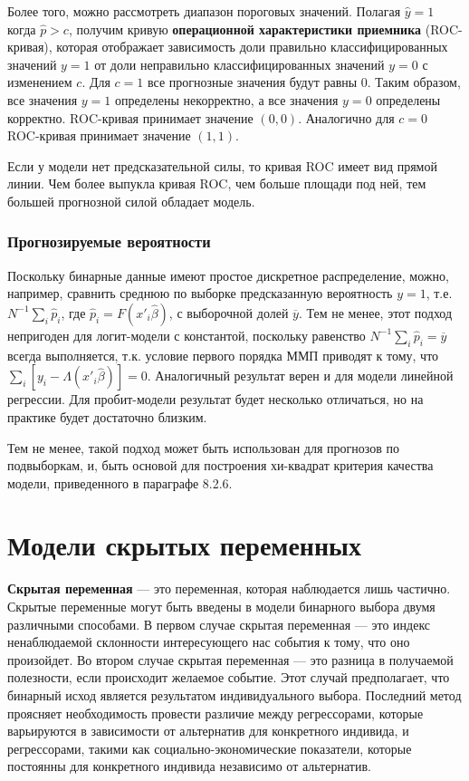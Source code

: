 Более того,  можно рассмотреть диапазон пороговых значений. Полагая $\hat{y}=1$  когда $\hat{p}>c$,  получим кривую \textbf{операционной характеристики приемника} (ROC-кривая),  которая отображает зависимость доли правильно классифицированных значений $y=1$ от доли неправильно классифицированных значений $y=0$ с изменением $c$. Для $c=1$ все прогнозные значения будут равны 0. Таким образом,  все значения  $y=1$ определены некорректно,  а все значения $y=0$ определены корректно. ROC-кривая принимает значение $(0, 0)$. Аналогично для $c=0$ ROC-кривая принимает значение $(1, 1).$

Если у модели нет предсказательной силы, то кривая ROC имеет вид прямой линии. Чем более выпукла кривая ROC, чем больше площади под ней, тем большей прогнозной силой обладает модель.

\subsubsection*{Прогнозируемые вероятности}

Поскольку бинарные данные имеют простое дискретное распределение,  можно, например, сравнить среднюю по выборке предсказанную вероятность  $y=1$, т.е. $N^{-1}\sum_i \hat{p}_i$,  где $\hat{p}_i = F(x'_i \widehat\beta)$,  с выборочной долей $\overline{y}$. Тем не менее,  этот подход непригоден для логит-модели с константой,  поскольку равенство $N^{-1}\sum_i \hat{p}_i=\overline{y}$ всегда выполняется, т.к.  условие первого порядка  ММП приводят к тому, что $\sum_i [y_i-\Lambda (x'_i\widehat\beta)]=0.$ Аналогичный результат верен и для модели линейной регрессии. Для пробит-модели результат будет несколько отличаться,  но на практике будет достаточно близким.

Тем не менее,  такой подход может быть использован для прогнозов по подвыборкам,  и,  быть  основой для построения хи-квадрат критерия качества модели,  приведенного в параграфе 8.2.6.

\section{Модели скрытых переменных}

\textbf{Скрытая переменная} --- это переменная,  которая наблюдается лишь частично. Скрытые переменные могут быть введены в модели бинарного выбора двумя различными способами. В первом случае скрытая переменная --- это индекс ненаблюдаемой склонности интересующего нас события к тому, что оно произойдет. Во втором случае скрытая переменная --- это разница в получаемой полезности,  если происходит желаемое событие. Этот случай предполагает,  что бинарный исход является результатом индивидуального выбора. Последний метод проясняет необходимость провести различие между регрессорами,  которые варьируются в зависимости от альтернатив для конкретного индивида,  и регрессорами,  такими как социально-экономические показатели,  которые постоянны для  конкретного индивида независимо от альтернатив.

